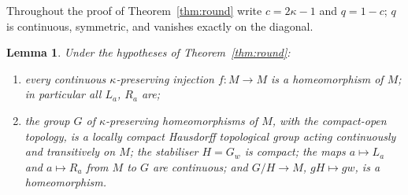 \documentclass[11pt,reqno]{amsart}
\newtheorem{lemma}[theorem]{Lemma}
\theoremstyle{definition}
\theoremstyle{remark}
\numberwithin{equation}{section}
\begin{document}
Throughout the proof of Theorem~\ref{thm:round} write $c=2\kappa-1$ and $q=1-c$; $q$ is continuous, symmetric, and vanishes exactly on the
diagonal.

\begin{lemma}\label{lem:roundG}
Under the hypotheses of Theorem~\ref{thm:round}:
\begin{enumerate}[label=(\roman*)]
\item every continuous $\kappa$-preserving injection $f\colon M\to M$ is a homeomorphism of $M$; in particular all $L_a$, $R_a$ are;
\item the group $G$ of $\kappa$-preserving homeomorphisms of $M$, with the compact-open topology, is a locally compact Hausdorff
topological group acting continuously and transitively on $M$; the stabiliser $H=G_w$ is compact; the maps $a\mapsto L_a$ and
$a\mapsto R_a$ from $M$ to $G$ are continuous; and $G/H\to M$, $gH\mapsto gw$, is a homeomorphism.
\end{enumerate}
\end{lemma}
\end{document}
